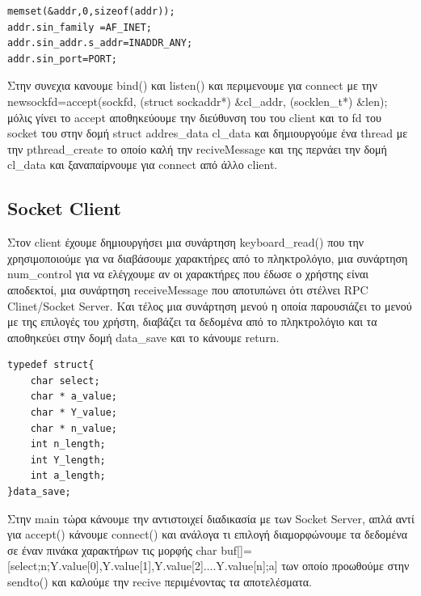 \begin{center}
	\begin{lstlisting}	
memset(&addr,0,sizeof(addr));
addr.sin_family =AF_INET;
addr.sin_addr.s_addr=INADDR_ANY;
addr.sin_port=PORT;
	\end{lstlisting}	
\end{center}

\noindent
Στην συνεχια κανουμε bind() και listen() και περιμενουμε για connect με την 
newsockfd=accept(sockfd, (struct sockaddr*) \&cl\_addr, (socklen\_t*) \&len); μόλις γίνει το accept αποθηκεύουμε
την διεύθυνση του του client και το fd του socket του στην δομή struct addres\_data cl\_data και δημιουργούμε ένα
thread με την pthread\_create το οποίο καλή την reciveMessage και της περνάει την δομή cl\_data και
ξαναπαίρνουμε για connect από άλλο client. 


\subsection{Socket Client}
\noindent
Στον client έχουμε δημιουργήσει μια συνάρτηση keyboard\_read() που την χρησιμοποιούμε για να διαβάσουμε χαρακτήρες
από το πληκτρολόγιο, μια συνάρτηση num\_control για να ελέγχουμε αν οι χαρακτήρες που έδωσε ο χρήστης είναι
αποδεκτοί, μια συνάρτηση receiveMessage που αποτυπώνει ότι στέλνει RPC Clinet/Socket Server. Και τέλος μια
συνάρτηση μενού η οποία παρουσιάζει το μενού με της επιλογές του χρήστη, διαβάζει τα δεδομένα από το πληκτρολόγιο
και τα αποθηκεύει στην δομή data\_save και το κάνουμε return. 

\begin{center}
	\begin{lstlisting}	
typedef struct{
    char select;
    char * a_value;
    char * Y_value;
    char * n_value; 
    int n_length;
    int Y_length; 
    int a_length;
}data_save;
	\end{lstlisting}	
\end{center}

\noindent
Στην main τώρα κάνουμε την αντιστοιχεί διαδικασία με των Socket Server, απλά αντί για accept() κάνουμε connect()
και ανάλογα τι επιλογή διαμορφώνουμε τα δεδομένα σε έναν πινάκα χαρακτήρων τις μορφής char buf[]=[select;n;Y.value[0],Y.value[1],Y.value[2]....Y.value[n];a] των οποίο προωθούμε στην sendto() και καλούμε
την recive περιμένοντας τα αποτελέσματα. 

\noindent


\noindent


\noindent

\noindent

\noindent

\noindent

